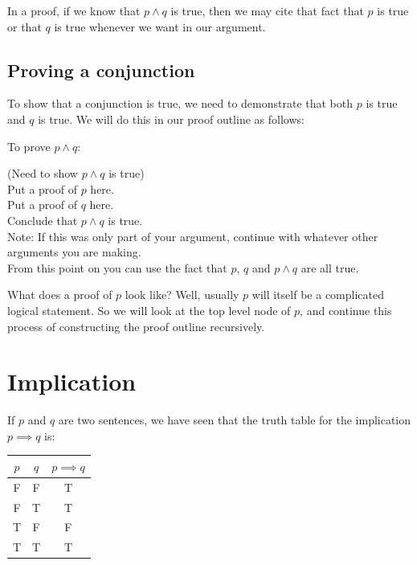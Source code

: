 In a proof, if we know that $p \wedge q$ is true, then we may cite that fact that $p$ is true or that $q$ is true whenever we want in our argument. 

\subsection{Proving a conjunction}  To show that a conjunction is true, we need to demonstrate that both $p$ is true and $q$ is true.  We will do this in our proof outline as follows:

To prove $p \wedge q$:

\begin{fitch*}
		\textrm{(Need to show $p \wedge q$ is true)}\\
		\textrm{Put a proof of $p$ here.}\\
		\textrm{Put a proof of $q$ here.}\\
		\textrm{Conclude that $p \wedge q$ is true.}\\
		\textrm{Note: If this was only part of your argument, continue with whatever other arguments you are making.}\\ \textrm{ \hphantom{Note:}From this point on you can use the fact that $p$, $q$ and $p \wedge q$ are all true.}\\
	\end{fitch*}

What does a proof of $p$ look like?  Well, usually $p$ will itself be a complicated logical statement.  So we will look at the top level node of $p$, and continue this process of constructing the proof outline recursively.

\newpage

\section{Implication}

If $p$ and $q$ are two sentences, we have seen that the truth table for the implication $p \implies q$ is:

\begin{table}[h]
	\centering
	\begin{tabular}{c|c|c}
		$p$ & $q$ & $p \implies q$ 	\\ \hline
		F & F & T 	\\ \hline
		F & T & T 	\\ \hline
		T & F & F 	\\ \hline
		T &  T & T 	\\ \hline
	\end{tabular}
\end{table}


